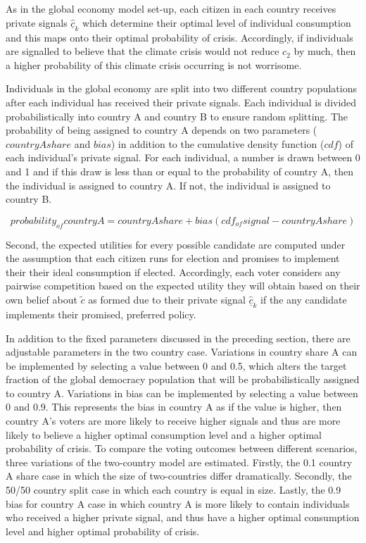 \documentclass[11pt,preprint, authoryear]{elsarticle}
\numberwithin{equation}{section}
\numberwithin{figure}{section}
\numberwithin{table}{section}
\begin{document}
As in the global economy model set-up, each citizen in each country
receives private signals \(\hat{\underline{c}}_k\) which determine their
optimal level of individual consumption and this maps onto their optimal
probability of crisis. Accordingly, if individuals are signalled to
believe that the climate crisis would not reduce \(c_2\) by much, then a
higher probability of this climate crisis occurring is not worrisome.

Individuals in the global economy are split into two different country
populations after each individual has received their private signals.
Each individual is divided probabilistically into country A and country
B to ensure random splitting. The probability of being assigned to
country A depends on two parameters (\(countryAshare\) and \(bias\)) in
addition to the cumulative density function (\(cdf\)) of each
individual's private signal. For each individual, a number is drawn
between 0 and 1 and if this draw is less than or equal to the
probability of country A, then the individual is assigned to country A.
If not, the individual is assigned to country B.

\[probability_{of}country A = country A share + bias(cdf_{of}signal - country A share)\]

Second, the expected utilities for every possible candidate are computed
under the assumption that each citizen runs for election and promises to
implement their their ideal consumption if elected. Accordingly, each
voter considers any pairwise competition based on the expected utility
they will obtain based on their own belief about \(\tilde{c}\) as formed
due to their private signal \(\hat{\underline{c}}_k\) if the any
candidate implements their promised, preferred policy.

In addition to the fixed parameters discussed in the preceding section,
there are adjustable parameters in the two country case. Variations in
country share A can be implemented by selecting a value between 0 and
0.5, which alters the target fraction of the global democracy population
that will be probabilistically assigned to country A. Variations in bias
can be implemented by selecting a value between 0 and 0.9. This
represents the bias in country A as if the value is higher, then country
A's voters are more likely to receive higher signals and thus are more
likely to believe a higher optimal consumption level and a higher
optimal probability of crisis. To compare the voting outcomes between
different scenarios, three variations of the two-country model are
estimated. Firstly, the 0.1 country A share case in which the size of
two-countries differ dramatically. Secondly, the 50/50 country split
case in which each country is equal in size. Lastly, the 0.9 bias for
country A case in which country A is more likely to contain individuals
who received a higher private signal, and thus have a higher optimal
consumption level and higher optimal probability of crisis.
\end{document}
